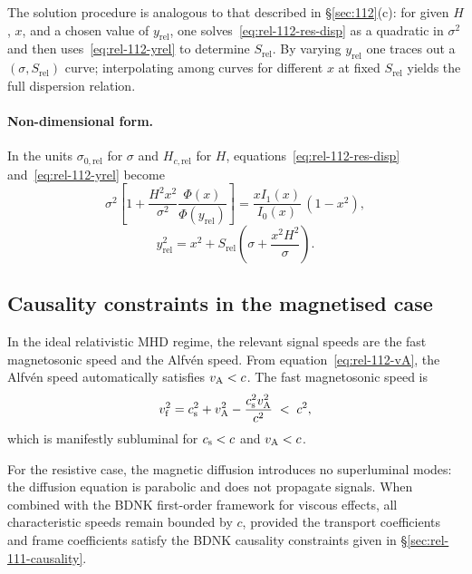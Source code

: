 The solution procedure is analogous to that described in
\S\ref{sec:112}(c): for given $H$, $x$, and a chosen value of
$y_{\mathrm{rel}}$, one solves~\eqref{eq:rel-112-res-disp} as a
quadratic in $\sigma^{2}$ and then
uses~\eqref{eq:rel-112-yrel} to determine $S_{\mathrm{rel}}$.
By varying $y_{\mathrm{rel}}$ one traces out a
$(\sigma, S_{\mathrm{rel}})$ curve; interpolating among curves for
different $x$ at fixed $S_{\mathrm{rel}}$ yields the full
dispersion relation.

\paragraph{Non-dimensional form.}
In the units $\sigma_{0,\mathrm{rel}}$ for $\sigma$ and
$H_{c,\mathrm{rel}}$ for $H$, equations~\eqref{eq:rel-112-res-disp}
and~\eqref{eq:rel-112-yrel} become
\begin{equation}
\label{eq:rel-112-nondim1}
\sigma^{2}\left[1 + \frac{H^{2}x^{2}}{\sigma^{2}}
  \frac{\Phi(x)}{\Phi(y_{\mathrm{rel}})}\right]
  = \frac{xI_{1}(x)}{I_{0}(x)}\,(1-x^{2}),
\end{equation}
\begin{equation}
\label{eq:rel-112-nondim2}
y_{\mathrm{rel}}^{2} = x^{2}
  + S_{\mathrm{rel}}\left(\sigma
  + \frac{x^{2}H^{2}}{\sigma}\right).
\end{equation}

\subsection{Causality constraints in the magnetised case}
\label{sec:rel-112-causality}

In the ideal relativistic MHD regime, the relevant signal speeds are
the fast magnetosonic speed and the Alfv\'en speed.  From
equation~\eqref{eq:rel-112-vA}, the Alfv\'en speed automatically
satisfies $v_{\mathrm{A}} < c$.  The fast magnetosonic speed is
\begin{equation}
\label{eq:rel-112-vf}
v_{\mathrm{f}}^{2} = c_{\mathrm{s}}^{2} + v_{\mathrm{A}}^{2}
  - \frac{c_{\mathrm{s}}^{2}v_{\mathrm{A}}^{2}}{c^{2}} \;<\; c^{2},
\end{equation}
which is manifestly subluminal for $c_{\mathrm{s}} < c$ and $v_{\mathrm{A}} < c$.

For the resistive case, the magnetic diffusion introduces no
superluminal modes: the diffusion equation is parabolic and does not
propagate signals.  When combined with the BDNK first-order framework
for viscous effects, all characteristic speeds remain bounded by $c$,
provided the transport coefficients and frame coefficients satisfy the
BDNK causality constraints given in \S\ref{sec:rel-111-causality}.

